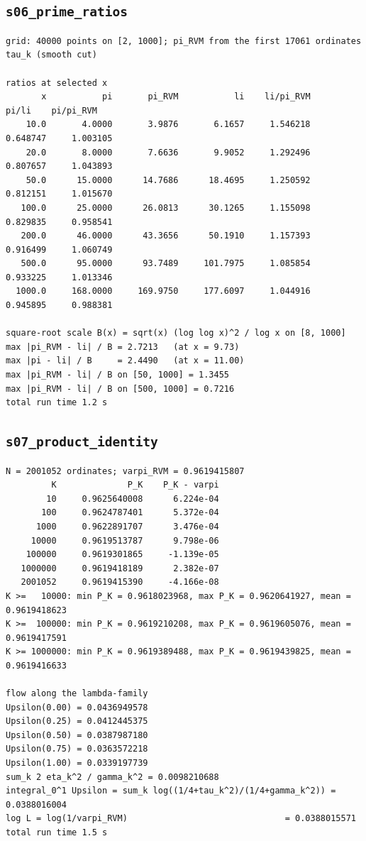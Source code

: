 \documentclass[11pt,reqno]{amsart}
\numberwithin{equation}{section}
\theoremstyle{plain}
\theoremstyle{definition}
\theoremstyle{remark}
\begin{document}
\subsection{\texttt{s06\_prime\_ratios}}
\label{app:out-s06-prime-ratios}

\begin{lstlisting}[style=out]
grid: 40000 points on [2, 1000]; pi_RVM from the first 17061 ordinates tau_k (smooth cut)

ratios at selected x
       x           pi       pi_RVM           li    li/pi_RVM        pi/li    pi/pi_RVM
    10.0       4.0000       3.9876       6.1657     1.546218     0.648747     1.003105
    20.0       8.0000       7.6636       9.9052     1.292496     0.807657     1.043893
    50.0      15.0000      14.7686      18.4695     1.250592     0.812151     1.015670
   100.0      25.0000      26.0813      30.1265     1.155098     0.829835     0.958541
   200.0      46.0000      43.3656      50.1910     1.157393     0.916499     1.060749
   500.0      95.0000      93.7489     101.7975     1.085854     0.933225     1.013346
  1000.0     168.0000     169.9750     177.6097     1.044916     0.945895     0.988381

square-root scale B(x) = sqrt(x) (log log x)^2 / log x on [8, 1000]
max |pi_RVM - li| / B = 2.7213   (at x = 9.73)
max |pi - li| / B     = 2.4490   (at x = 11.00)
max |pi_RVM - li| / B on [50, 1000] = 1.3455
max |pi_RVM - li| / B on [500, 1000] = 0.7216
total run time 1.2 s
\end{lstlisting}

\subsection{\texttt{s07\_product\_identity}}
\label{app:out-s07-product-identity}

\begin{lstlisting}[style=out]
N = 2001052 ordinates; varpi_RVM = 0.9619415807
         K              P_K    P_K - varpi
        10     0.9625640008      6.224e-04
       100     0.9624787401      5.372e-04
      1000     0.9622891707      3.476e-04
     10000     0.9619513787      9.798e-06
    100000     0.9619301865     -1.139e-05
   1000000     0.9619418189      2.382e-07
   2001052     0.9619415390     -4.166e-08
K >=   10000: min P_K = 0.9618023968, max P_K = 0.9620641927, mean = 0.9619418623
K >=  100000: min P_K = 0.9619210208, max P_K = 0.9619605076, mean = 0.9619417591
K >= 1000000: min P_K = 0.9619389488, max P_K = 0.9619439825, mean = 0.9619416633

flow along the lambda-family
Upsilon(0.00) = 0.0436949578
Upsilon(0.25) = 0.0412445375
Upsilon(0.50) = 0.0387987180
Upsilon(0.75) = 0.0363572218
Upsilon(1.00) = 0.0339197739
sum_k 2 eta_k^2 / gamma_k^2 = 0.0098210688
integral_0^1 Upsilon = sum_k log((1/4+tau_k^2)/(1/4+gamma_k^2)) = 0.0388016004
log L = log(1/varpi_RVM)                               = 0.0388015571
total run time 1.5 s
\end{lstlisting}
\end{document}
